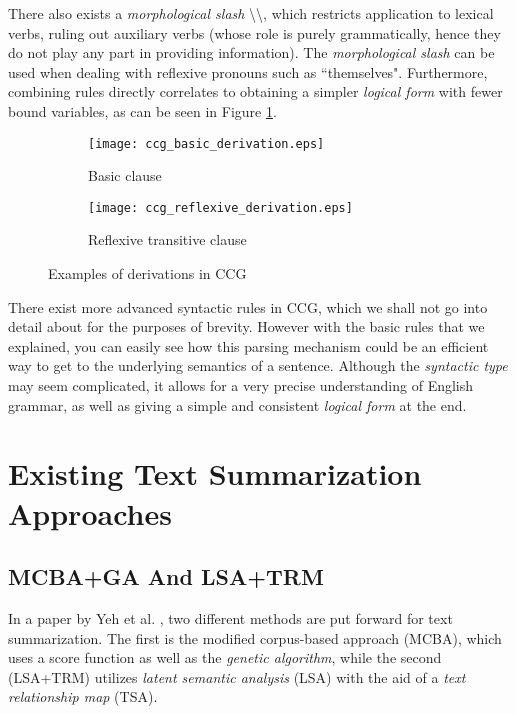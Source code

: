 \mbox{}

There also exists a \textit{morphological slash} \textbackslash\textbackslash, which restricts application to lexical verbs, ruling out auxiliary verbs (whose role is purely grammatically, hence they do not play any part in providing information). The \textit{morphological slash} can be used when dealing with reflexive pronouns such as ``themselves". Furthermore, combining rules directly correlates to obtaining a simpler \textit{logical form} with fewer bound variables, as can be seen in Figure \ref{fig:ccg_derivations}.

\begin{figure}[H]
\centering
\begin{subfigure}{0.3\textwidth}
\centering
\texttt{[image: ccg\_basic\_derivation.eps]}
\caption{\cite{steedman_combinatory_nodate} Basic clause}
\end{subfigure}
\begin{subfigure}{0.6\textwidth}
\centering
\texttt{[image: ccg\_reflexive\_derivation.eps]}
\caption{\cite{steedman_combinatory_nodate} Reflexive transitive clause}
\end{subfigure}
\caption{Examples of derivations in CCG}
\label{fig:ccg_derivations}
\end{figure}

There exist more advanced syntactic rules in CCG, which we shall not go into detail about for the purposes of brevity. However with the basic rules that we explained, you can easily see how this parsing mechanism could be an efficient way to get to the underlying semantics of a sentence. Although the \textit{syntactic type} may seem complicated, it allows for a very precise understanding of English grammar, as well as giving a simple and consistent \textit{logical form} at the end.

\section{Existing Text Summarization Approaches}

\subsection{MCBA+GA And LSA+TRM}

In a paper by Yeh et al. \cite{yeh_text_2005}, two different methods are put forward for text summarization. The first is the modified corpus-based approach (MCBA), which uses a score function as well as the \textit{genetic algorithm}, while the second (LSA+TRM) utilizes \textit{latent semantic analysis} (LSA) with the aid of a \textit{text relationship map} (TSA).

